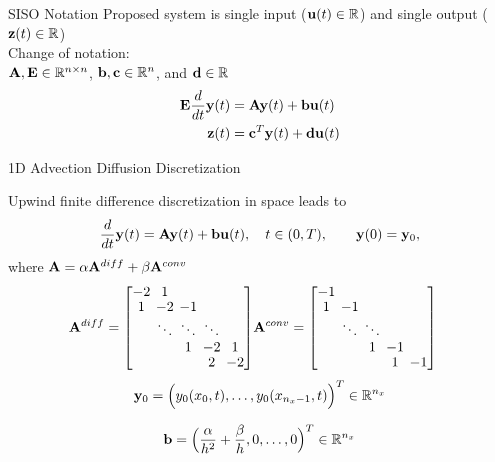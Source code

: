 \begin{frame}{SISO Notation}
Proposed system is single input (${\bf u}(t) \in \mathbb{R}$) and single output (${\bf z}(t) \in \mathbb{R}$)\\
\bigskip
Change of notation:\\
\bigskip
${\mathbf A}, {\bf E} \in \mathbb{R}^{n \times n}$, ${\bf b},{\bf c} \in \mathbb{R}^n$, and ${\bf d} \in \mathbb{R}$\\

\begin{align*}
            {\bf E}\frac{d}{dt} {\bf y}(t)  &= {\mathbf A} {\bf y}(t) + {\bf b}{\bf u}(t)\\
            {\bf z}(t) &= {\bf c}^T {\bf y}(t) + {\bf d}{\bf u}(t)
\end{align*}


\end{frame}



\begin{frame}{1D Advection Diffusion Discretization}

Upwind finite difference discretization in space leads to
         \[
                    \frac{d}{dt} {\bf y}(t)  = {\mathbf A} {\bf y}(t) + {\bf b}{\bf u}(t), \quad t \in (0,T), \qquad {\bf y}(0) = {\bf y}_0,
        \]
        where \({\bf A} = \alpha {\mathbf A}^{diff} + \beta {\mathbf A}^{conv}\)
        \begin{align*}
              \setlength{\arraycolsep}{2pt}
              \renewcommand{\arraystretch}{0.9}
              \bA^{diff} = \begin{bmatrix}
              -2 & 1\\
              1 & -2 & -1\\
              &   \ddots & \ddots & \ddots\\
              &   &     1 & -2 & 1\\
              &&& 2 & -2
              \end{bmatrix}
        &
              \setlength{\arraycolsep}{2pt}
              \renewcommand{\arraystretch}{0.9}
              \bA^{conv} = \begin{bmatrix}
              -1\\
              1 & -1 \\
              &   \ddots & \ddots\\
              &   &     1 & -1\\
              &&& 1 & -1
              \end{bmatrix}
        \end{align*}
        \[
             {\bf y}_0 =  \Big(y_0(x_0,t), \ldots,  y_0(x_{n_x-1},t) \Big)^T \in \mathbb{R}^{n_x}             
        \]
        
        \[
             {\bf b} =  \Big( \frac{\alpha}{h^{2}}+\frac{\beta}{h},0, \ldots,0 \Big)^T \in \mathbb{R}^{n_x}             
        \]

\end{frame}


